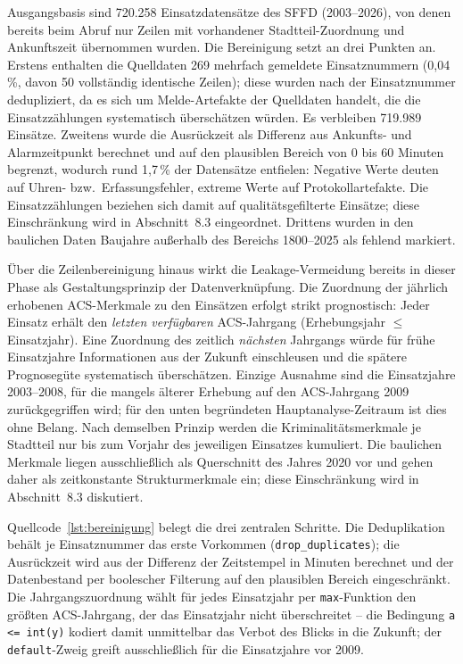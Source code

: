 Ausgangsbasis sind 720.258 Einsatzdatensätze des SFFD (2003--2026), von
denen bereits beim Abruf nur Zeilen mit vorhandener Stadtteil-Zuordnung und
Ankunftszeit übernommen wurden. Die Bereinigung setzt an drei Punkten an.
Erstens enthalten die Quelldaten 269 mehrfach gemeldete Einsatznummern
(0,04\,\%, davon 50 vollständig identische Zeilen); diese wurden nach der
Einsatznummer dedupliziert, da es sich um Melde-Artefakte der Quelldaten
handelt, die die Einsatzzählungen systematisch überschätzen würden. Es
verbleiben 719.989 Einsätze. Zweitens wurde die Ausrückzeit als Differenz
aus Ankunfts- und Alarmzeitpunkt berechnet und auf den plausiblen Bereich
von 0 bis 60 Minuten begrenzt, wodurch rund 1,7\,\% der Datensätze
entfielen: Negative Werte deuten auf Uhren- bzw.\ Erfassungsfehler, extreme
Werte auf Protokollartefakte. Die Einsatzzählungen beziehen sich damit auf
qualitätsgefilterte Einsätze; diese Einschränkung wird in Abschnitt~8.3
eingeordnet. Drittens wurden in den baulichen Daten Baujahre außerhalb des
Bereichs 1800--2025 als fehlend markiert.

Über die Zeilenbereinigung hinaus wirkt die Leakage-Vermeidung bereits in
dieser Phase als Gestaltungsprinzip der Datenverknüpfung. Die Zuordnung der
jährlich erhobenen ACS-Merkmale zu den Einsätzen erfolgt strikt
prognostisch: Jeder Einsatz erhält den \emph{letzten verfügbaren}
ACS-Jahrgang (Erhebungsjahr $\leq$ Einsatzjahr). Eine Zuordnung des zeitlich
\emph{nächsten} Jahrgangs würde für frühe Einsatzjahre Informationen aus der
Zukunft einschleusen und die spätere Prognosegüte systematisch
überschätzen. Einzige Ausnahme sind die Einsatzjahre 2003--2008, für die
mangels älterer Erhebung auf den ACS-Jahrgang 2009 zurückgegriffen wird;
für den unten begründeten Hauptanalyse-Zeitraum ist dies ohne Belang. Nach
demselben Prinzip werden die Kriminalitätsmerkmale je Stadtteil nur bis zum
Vorjahr des jeweiligen Einsatzes kumuliert. Die baulichen Merkmale liegen
ausschließlich als Querschnitt des Jahres 2020 vor und gehen daher als
zeitkonstante Strukturmerkmale ein; diese Einschränkung wird in
Abschnitt~8.3 diskutiert.

Quellcode~\ref{lst:bereinigung} belegt die drei zentralen Schritte. Die
Deduplikation behält je Einsatznummer das erste Vorkommen
(\texttt{drop\_duplicates}); die Ausrückzeit wird aus der Differenz der
Zeitstempel in Minuten berechnet und der Datenbestand per boolescher
Filterung auf den plausiblen Bereich eingeschränkt. Die Jahrgangszuordnung
wählt für jedes Einsatzjahr per \texttt{max}-Funktion den größten
ACS-Jahrgang, der das Einsatzjahr nicht überschreitet -- die Bedingung
\texttt{a <= int(y)} kodiert damit unmittelbar das Verbot des Blicks in die
Zukunft; der \texttt{default}-Zweig greift ausschließlich für die
Einsatzjahre vor 2009.

